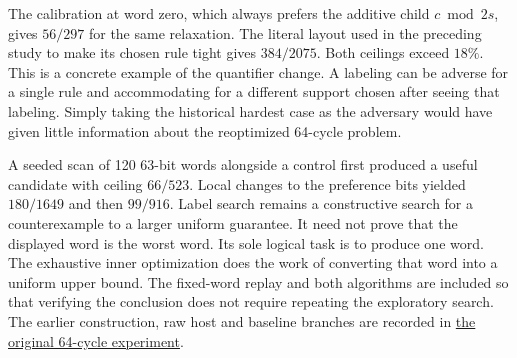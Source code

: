 The calibration at word zero, which always prefers the additive child \(c\bmod 2s\), gives \(56/297\) for the same relaxation. The literal layout used in the preceding study to make its chosen rule tight gives \(384/2075\). Both ceilings exceed \(18\%\). This is a concrete example of the quantifier change. A labeling can be adverse for a single rule and accommodating for a different support chosen after seeing that labeling. Simply taking the historical hardest case as the adversary would have given little information about the reoptimized 64-cycle problem.

A seeded scan of 120 63-bit words alongside a control first produced a useful candidate with ceiling \(66/523\). Local changes to the preference bits yielded \(180/1649\) and then \(99/916\). Label search remains a constructive search for a counterexample to a larger uniform guarantee. It need not prove that the displayed word is the worst word. Its sole logical task is to produce one word. The exhaustive inner optimization does the work of converting that word into a uniform upper bound. The fixed-word replay and both algorithms are included so that verifying the conclusion does not require repeating the exploratory search. The earlier construction, raw host and baseline branches are recorded in \href{https://github.com/nousentllc/riemann-hypothesis/pull/14}{the original 64-cycle experiment}.
